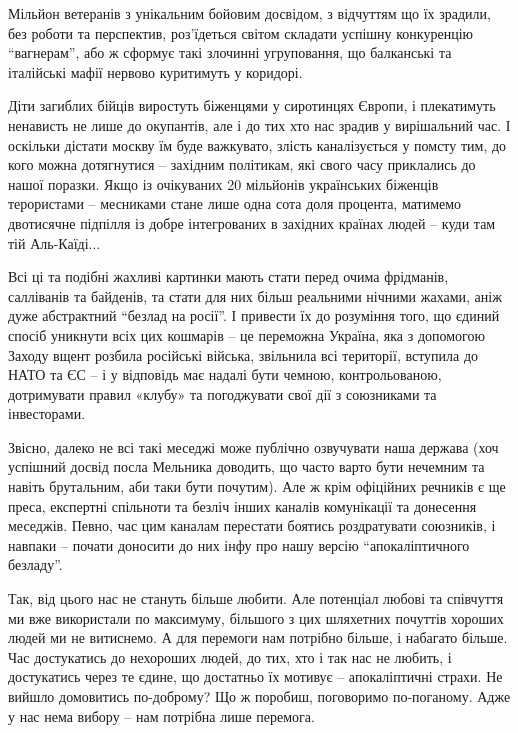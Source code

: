 Мільйон ветеранів з унікальним бойовим досвідом, з відчуттям що їх зрадили, без
роботи та перспектив, роз'їдеться світом складати успішну конкуренцію
\enquote{вагнерам}, або ж сформує такі злочинні угруповання, що балканські та
італійські мафії нервово куритимуть у коридорі.

Діти загиблих бійців виростуть біженцями у сиротинцях Європи, і плекатимуть
ненависть не лише до окупантів, але і до тих хто нас зрадив у вирішальний час.
І оскільки дістати москву їм буде важкувато, злість каналізується у помсту тим,
до кого можна дотягнутися – західним політикам, які свого часу приклались до
нашої поразки. Якщо із очікуваних 20 мільйонів українських біженців терористами
– месниками стане лише одна сота доля процента, матимемо двотисячне підпілля із
добре інтегрованих в західних країнах людей – куди там тій Аль-Каїді...

Всі ці та подібні жахливі картинки мають стати перед очима фрідманів,
салліванів та байденів, та стати для них більш реальними нічними жахами, аніж
дуже абстрактний \enquote{безлад на росії}. І привести їх до розуміння того, що єдиний
спосіб уникнути всіх цих кошмарів – це переможна Україна, яка з допомогою
Заходу вщент розбила російські війська, звільнила всі території, вступила до
НАТО та ЄС – і у відповідь має надалі бути чемною, контрольованою, дотримувати
правил «клубу» та погоджувати свої дії з союзниками та інвесторами.

Звісно, далеко не всі такі меседжі може публічно озвучувати наша держава (хоч
успішний досвід посла Мельника доводить, що часто варто бути нечемним та навіть
брутальним, аби таки бути почутим). Але ж крім офіційних речників є ще преса,
експертні спільноти та безліч інших каналів комунікації та донесення меседжів.
Певно, час цим каналам перестати боятись роздратувати союзників, і навпаки –
почати доносити до них інфу про нашу версію \enquote{апокаліптичного безладу}.

Так, від цього нас не стануть більше любити. Але потенціал любові та співчуття
ми вже використали по максимуму, більшого з цих шляхетних почуттів хороших
людей ми не витиснемо. А для перемоги нам потрібно більше, і набагато більше.
Час достукатись до нехороших людей, до тих, хто і так нас не любить, і
достукатись через те єдине, що достатньо їх мотивує – апокаліптичні страхи. Не
вийшло домовитись по-доброму? Що ж поробиш, поговоримо по-поганому. Адже у нас
нема вибору – нам потрібна лише перемога.
